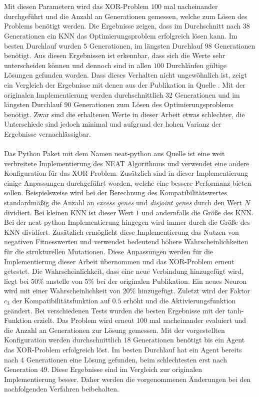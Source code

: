 \\\\ %
Mit diesen Parametern wird das XOR-Problem $100$ mal nacheinander durchgeführt und die Anzahl an Generationen gemessen, welche zum Lösen des Problems benötigt werden. Die Ergebnisse zeigen, dass im Durchschnitt nach $38$ Generationen ein \ac{KNN} das Optimierungsproblem erfolgreich lösen kann. Im besten Durchlauf wurden $5$ Generationen, im längsten Durchlauf $98$ Generationen benötigt. Aus diesen Ergebnissen ist erkennbar, dass sich die Werte sehr unterscheiden können und dennoch sind in allen $100$ Durchläufen gültige Lösungen gefunden worden. Dass dieses Verhalten nicht ungewöhnlich ist, zeigt ein Vergleich der Ergebnisse mit denen aus der Publikation in Quelle \cite{stanley2002evolving}. Mit der originalen Implementierung werden durchschnittlich $32$ Generationen und im längsten Durchlauf $90$ Generationen zum Lösen des Optimierungsproblems benötigt. Zwar sind die erhaltenen Werte in dieser Arbeit etwas schlechter, die Unterschiede sind jedoch minimal und aufgrund der hohen Varianz der Ergebnisse vernachlässigbar.
\\\\
Das Python Paket mit dem Namen neat-python aus Quelle \cite{mcintyre_neatpython} ist eine weit verbreitete Implementierung des \ac{NEAT} Algorithmus und verwendet eine andere Konfiguration für das XOR-Problem. Zusätzlich sind in dieser Implementierung einige Anpassungen durchgeführt worden, welche eine bessere Performanz bieten sollen. Beispielsweise wird bei der Berechnung des Kompatibilitätswertes standardmäßig die Anzahl an \emph{excess genes} und \emph{disjoint genes} durch den Wert $N$ dividiert. Bei kleinen \ac{KNN} ist dieser Wert $1$ und andernfalls die Größe des \ac{KNN}. Bei der neat-python Implementierung hingegen wird immer durch die Größe des \ac{KNN} dividiert. Zusätzlich ermöglicht diese Implementierung das Nutzen von negativen Fitnesswerten und verwendet bedeutend höhere Wahrscheinlichkeiten für die strukturellen Mutationen. Diese Anpassungen werden für die Implementierung dieser Arbeit übernommen und das XOR-Problem erneut getestet. Die Wahrscheinlichkeit, dass eine neue Verbindung hinzugefügt wird, liegt bei $50\%$ anstelle von $5\%$ bei der originalen Publikation. Ein neues Neuron wird mit einer Wahrscheinlichkeit von $20\%$ hinzugefügt. Zuletzt wird der Faktor $c_3$ der Kompatibilitätsfunktion auf $0.5$ erhöht und die Aktivierungsfunktion geändert. Bei verschiedenen Tests wurden die besten Ergebnisse mit der \ac{tanh}-Funktion erzielt. Das Problem wird erneut $100$ mal nacheinander evaluiert und die Anzahl an Generationen zur Lösung gemessen. Mit der vorgestellten Konfiguration werden durchschnittlich $18$ Generationen benötigt bis ein Agent das XOR-Problem erfolgreich löst. Im besten Durchlauf hat ein Agent bereits nach $4$ Generationen eine Lösung gefunden, beim schlechtesten erst nach Generation $49$. Diese Ergebnisse sind im Vergleich zur originalen Implementierung besser. Daher werden die vorgenommenen Änderungen bei den nachfolgenden Verfahren beibehalten.

